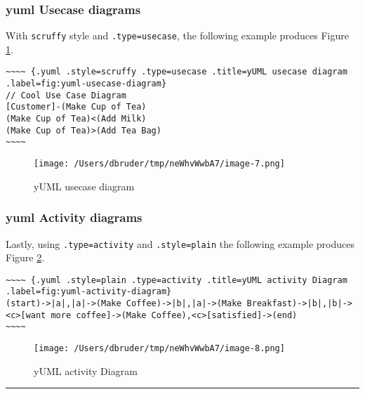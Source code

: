 \documentclass[]{article}
\begin{document}
\newpage

\subsubsection{yuml Usecase diagrams}\label{yuml-usecase-diagrams}

With \texttt{scruffy} style and \texttt{.type=usecase}, the following
example produces Figure \ref{fig:yuml-usecase-diagram}.

\scriptsize

\begin{verbatim}
~~~~ {.yuml .style=scruffy .type=usecase .title=yUML usecase diagram .label=fig:yuml-usecase-diagram}
// Cool Use Case Diagram
[Customer]-(Make Cup of Tea)
(Make Cup of Tea)<(Add Milk)
(Make Cup of Tea)>(Add Tea Bag)
~~~~
\end{verbatim}

\normalsize

\begin{figure}[htbp]
\centering
\texttt{[image: /Users/dbruder/tmp/neWhvWwbA7/image-7.png]}
\caption{yUML usecase diagram\label{fig:yuml-usecase-diagram}}
\end{figure}

\newpage

\subsubsection{yuml Activity diagrams}\label{yuml-activity-diagrams}

Lastly, using \texttt{.type=activity} and \texttt{.style=plain} the
following example produces Figure \ref{fig:yuml-activity-diagram}.

\scriptsize

\begin{verbatim}
~~~~ {.yuml .style=plain .type=activity .title=yUML activity Diagram .label=fig:yuml-activity-diagram}
(start)->|a|,|a|->(Make Coffee)->|b|,|a|->(Make Breakfast)->|b|,|b|-><c>[want more coffee]->(Make Coffee),<c>[satisfied]->(end)
~~~~
\end{verbatim}

\normalsize

\begin{figure}[htbp]
\centering
\texttt{[image: /Users/dbruder/tmp/neWhvWwbA7/image-8.png]}
\caption{yUML activity Diagram\label{fig:yuml-activity-diagram}}
\end{figure}

\begin{center}\rule{3in}{0.4pt}\end{center}
\end{document}
